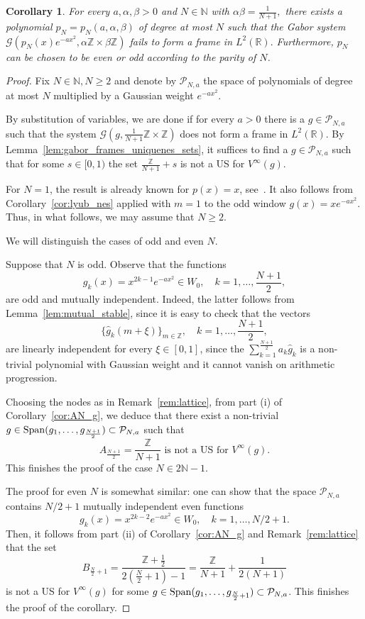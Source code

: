 \documentclass[12pt]{amsart}
\numberwithin{equation}{section}
\newtheorem{corollary}[theorem]{Corollary} \newcommand{\La}{\Lambda}
\newcommand{\R}{{\mathbb R}} \newcommand{\Q}{{\mathbb Q}} \newcommand{\Z}{{\mathbb Z}} \newcommand{\N}{{\mathbb N}}
\begin{document}
\begin{corollary}\label{cor:sharp_hermite}
For every $a,\alpha, \beta>0$ and $N\in \N$ with $ \alpha \beta = \frac{1}{N+1},$ there exists a polynomial $p_N=p_N(a,\alpha,\beta)$ of degree at most $N$ such that the Gabor system $\mathcal{G}(p_N(x)e^{-ax^2}, \alpha\Z \times \beta\Z)$
 fails to form a frame in $ L^2(\R).$ Furthermore, $p_N$ can be chosen to be even or odd according to the parity of $N$.
\end{corollary}
\begin{proof}
Fix $N\in \N, N \geq 2$ and denote by $\mathcal{P}_{N,a}$ the space of polynomials of degree at most $N$ multiplied by a Gaussian weight $e^{-ax^2}$.

    By substitution of variables, we are done if for every $a>0$ there is a $g\in\mathcal{P}_{N,a}$
    such that the system $\mathcal{G}(g, \frac{1}{N+1}\Z \times \Z)$ does not form a frame in $L^2(\R)$. By Lemma~\ref{lem:gabor_frames_uniquenes_sets}, it suffices to find a $g \in \mathcal{P}_{N,a}$ such that for some $s\in[0,1)$ the set $\frac{\Z}{N+1} + s$ is not a US for $V^{\infty}(g)$.

For $N=1$, the result is already known for $p(x)=x$, see~\cite{MR3027914}.
It also follows from Corollary~\ref{cor:lyub_nes} applied with $m=1$ to the odd window
$g(x)=xe^{-ax^2}$. Thus, in what
follows, we may assume that $N\geq 2$.

We will distinguish the cases of odd and even $N$.
    
    Suppose that $N$ is odd.
    Observe that the functions
    $$
    g_k(x) = x^{2k-1} e^{-ax^2} \in W_0, \quad k=1,\dots,\frac{N+1}{2},
    $$
    are odd and mutually independent. Indeed, the latter follows from Lemma~\ref{lem:mutual_stable}, since it is easy to check that the vectors
    $$ \{\hat g_k(m+\xi)\}_{m \in \Z}, \quad k=1,\dots, \frac{N+1}{2},$$ are linearly independent for every $\xi \in[0,1]$, since the $\sum_{k=1}^\frac{N+1}{2} a_k \hat g_k$ is a non-trivial polynomial with Gaussian weight and it cannot vanish on arithmetic progression.
    
    Choosing the nodes as in Remark~\ref{rem:lattice}, from part (i) of Corollary~\ref{cor:AN_g}, we deduce that there exist a non-trivial $g\in {\rm Span} (g_1,\dots, g_{\frac{N+1}{2}}) \subset \mathcal{P}_{N,a}$ such that $$A_{\frac{N+1}{2}} = \frac{\Z}{N+1} \text{ is not a US for } V^{\infty}(g).$$ This finishes the proof of the case $N\in 2\N-1.$

    The proof for even $N$ is somewhat similar: one can show that the space $\mathcal{P}_{N,a}$ contains $N/2 + 1$ mutually independent even functions
    $$
    g_k(x) = x^{2k-2} e^{-ax^2} \in W_0, \quad k=1,\dots, N/2+1.
    $$ 
    Then, it follows from part (ii) of Corollary~\ref{cor:AN_g} and Remark~\ref{rem:lattice} that the set $$B_{\frac{N}{2}+1}=\frac{\Z + \frac{1}{2}}{2(\frac{N}{2}+1) - 1} = \frac{\Z }{N+1} + \frac{1}{2(N+1)}$$ is not a US for $V^{\infty}(g)$ for some $g \in {\rm Span} (g_1, \dots, g_{\frac{N}{2}+1}) \subset \mathcal{P}_{N,a}$. This finishes the proof of the corollary.
\end{proof}
\end{document}
